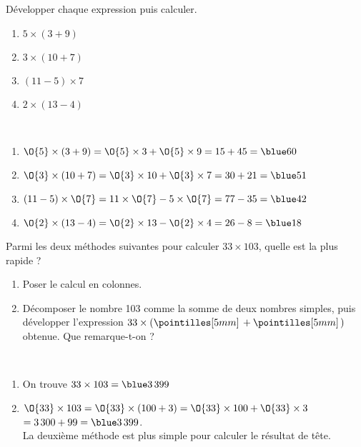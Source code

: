 \begin{colonne*exercice}
\bigskip


\begin{exercice} %
   Développer chaque expression puis calculer.
   \begin{enumerate}
      \item $5\times(3+9)$
      \item $3\times(10+7)$
      \item $(11-5)\times7$
      \item $2\times(13-4)$
   \end{enumerate}
\end{exercice}

\begin{corrige}
   \ \\ [-5mm]
   \begin{enumerate}
      \item $\O{5}\times(3+9) =\O{5}\times3+\O{5}\times9 =15+45 =\blue 60$
      \item $\O{3}\times(10+7) =\O{3}\times10+\O{3}\times7 =30+21 =\blue 51$
      \item $(11-5)\times\O{7} =11\times\O{7}-5\times\O{7} =77-35 =\blue 42$
      \item $\O{2}\times(13-4) =\O{2}\times13-\O{2}\times4 =26-8 =\blue 18$
   \end{enumerate}
\end{corrige}

\bigskip


\begin{exercice} %
   Parmi les deux méthodes suivantes pour calculer $33\times103$, quelle est la plus rapide ?
   \begin{enumerate}
      \item Poser le calcul en colonnes.
      \item Décomposer le nombre 103 comme la somme de deux nombres simples, puis développer l'expression $33\times(\pointilles[5mm]\,+ \pointilles[5mm]\,)$ obtenue. Que remarque-t-on ?
   \end{enumerate}
\end{exercice}

\begin{corrige}
   \ \\ [-5mm]
   \begin{enumerate}
      \item On trouve $33\times103 =\blue 3\,399$
      \item $\O{33}\times103 =\O{33}\times(100+3) =\O{33}\times100+\O{33}\times3$ \\
         \hspace*{18mm} $=3\,300+99 =\blue 3\,399$. \\
{\blue La deuxième méthode est plus simple pour calculer le résultat de tête}.
   \end{enumerate}
\end{corrige}


\end{colonne*exercice}
